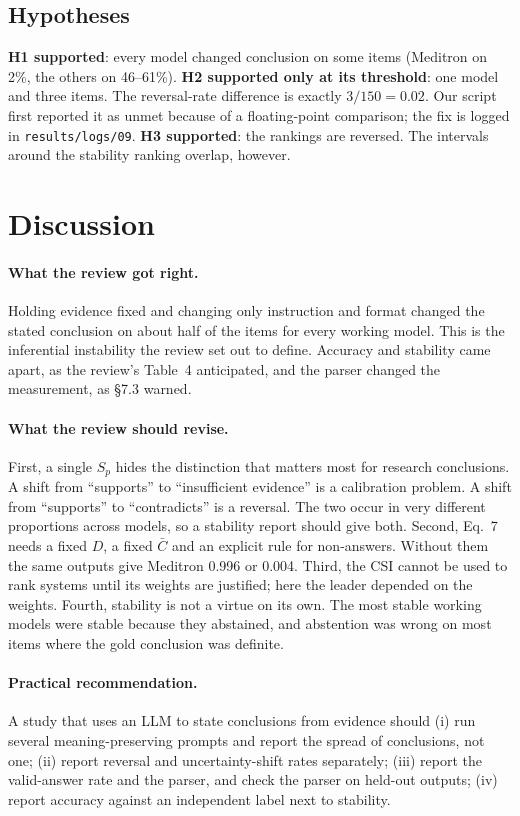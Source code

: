 \documentclass[acmsmall]{acmart}
\begin{document}
\subsection{Hypotheses}
\textbf{H1 supported}: every model changed conclusion on some items (Meditron on 2\%, the others on 46--61\%). \textbf{H2 supported only at its threshold}: one model and three items. The reversal-rate difference is exactly $3/150=0.02$. Our script first reported it as unmet because of a floating-point comparison; the fix is logged in \texttt{results/logs/09}. \textbf{H3 supported}: the rankings are reversed. The intervals around the stability ranking overlap, however.

\section{Discussion}\label{sec:discussion}
\paragraph{What the review got right.} Holding evidence fixed and changing only instruction and format changed the stated conclusion on about half of the items for every working model. This is the inferential instability the review set out to define. Accuracy and stability came apart, as the review's Table~4 anticipated, and the parser changed the measurement, as \S7.3 warned.

\paragraph{What the review should revise.} First, a single $S_p$ hides the distinction that matters most for research conclusions. A shift from ``supports'' to ``insufficient evidence'' is a calibration problem. A shift from ``supports'' to ``contradicts'' is a reversal. The two occur in very different proportions across models, so a stability report should give both. Second, Eq.~7 needs a fixed $D$, a fixed $\bar C$ and an explicit rule for non-answers. Without them the same outputs give Meditron 0.996 or 0.004. Third, the CSI cannot be used to rank systems until its weights are justified; here the leader depended on the weights. Fourth, stability is not a virtue on its own. The most stable working models were stable because they abstained, and abstention was wrong on most items where the gold conclusion was definite.

\paragraph{Practical recommendation.} A study that uses an LLM to state conclusions from evidence should (i) run several meaning-preserving prompts and report the spread of conclusions, not one; (ii) report reversal and uncertainty-shift rates separately; (iii) report the valid-answer rate and the parser, and check the parser on held-out outputs; (iv) report accuracy against an independent label next to stability.
\end{document}
